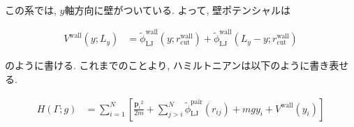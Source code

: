 \documentclass[dvipdfmx]{jsarticle}
\numberwithin{equation}{subsection}
\begin{document}






この系では, $y$軸方向に壁がついている. よって, 壁ポテンシャルは

\begin{align}
  V^{\text{wall}}(y; L_y) &= \tilde{\phi}_{\text{LJ}}^{\text{wall}}(y;r_{\text{cut}}^{\text{wall}}) + \tilde{\phi}_{\text{LJ}}^{\text{wall}}(L_y - y;r_{\text{cut}}^{\text{wall}})
\end{align}

のように書ける. これまでのことより, ハミルトニアンは以下のように書き表せる.

\begin{align}
  \label{Hamiltonian}
    H(\Gamma; g)
    &= \sum_{i=1}^{N}
    \left[
      \frac{{\bm{p}_i}^2}{2m} 
      + \sum_{j > i}^{N}
        \tilde{\phi}_{\text{LJ}}^{\text{pair}}(r_{ij})
      + mgy_i +V^{\text{wall}}(y_i)
    \right]
\end{align}
\end{document}

